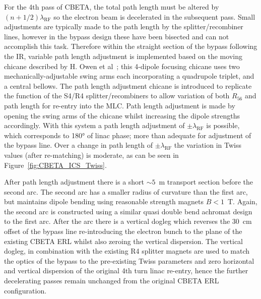 \documentclass[../main.tex]{subfiles}
\begin{document}
For the 4th pass of CBETA, the total path length must be altered by $(n+1/2)\lambda_{\mathrm{RF}}$ so the electron beam is decelerated in the subsequent pass. Small adjustments are typically made to the path length by the splitter/recombiner lines, however in the bypass design these have been bisected and can not accomplish this task. Therefore within the straight section of the bypass following the IR, variable path length adjustment is implemented based on the moving chicane described by H. Owen et al~\cite{owen2012modular}; this 4-dipole focusing chicane uses two mechanically-adjustable swing arms each incorporating a quadrupole triplet, and a central bellows. The path length adjustment chicane is introduced to replicate the function of the S4/R4 splitter/recombiners to allow variation of both $R_{56}$ and path length for re-entry into the MLC. Path length adjustment is made by opening the swing arms of the chicane whilst increasing the dipole strengths accordingly. With this system a path length adjustment of $\pm\lambda_{\mathrm{RF}}$ is possible, which corresponds to 180\si{\degree} of linac phase; more than adequate for adjustment of the bypass line. Over a change in path length of $\pm\lambda_{\mathrm{RF}}$ the variation in Twiss values (after re-matching) is moderate, as can be seen in Figure~\ref{fig:CBETA_ICS_Twiss}.

After path length adjustment there is a short $\sim5$~\si{\metre} transport section before the second arc. The second arc has a smaller radius of curvature than the first arc, but maintains dipole bending using reasonable strength magnets $B < 1$~\si{\tesla}. Again, the second arc is constructed using a similar quasi double bend achromat design to the first arc. After the arc there is a vertical dogleg which reverses the 30~\si{\centi\meter} offset of the bypass line re-introducing the electron bunch to the plane of the existing CBETA ERL whilst also zeroing the vertical dispersion. The vertical dogleg, in combination with the existing R4 splitter magnets are used to match the optics of the bypass to the pre-existing Twiss parameters and zero horizontal and vertical dispersion of the original 4th turn linac re-entry, hence the further decelerating passes remain unchanged from the original CBETA ERL configuration.   
\end{document}
